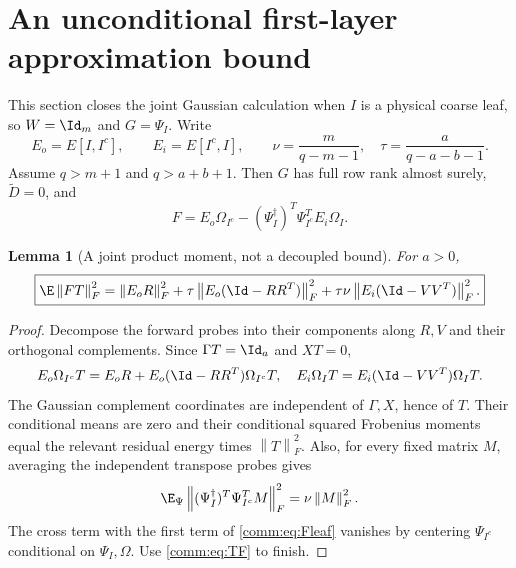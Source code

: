 \documentclass[11pt,oneside,openany,a4paper]{book}
\numberwithin{equation}{chapter}
\newtheorem{lemma}[theorem]{Lemma}
\theoremstyle{definition}
\theoremstyle{remark}
\newcommand{\F}[1]{\left\lVert#1\right\rVert_F}
\begin{document}
\section{An unconditional first-layer approximation bound}
This section closes the joint Gaussian calculation when $I$ is a physical coarse leaf, so $W=\Id_m$ and $G=\Psi_I$. Write
\[
 E_o=E[I,I^c],\qquad E_i=E[I^c,I],\qquad
 \nu=\frac{m}{q-m-1},\quad\tau=\frac{a}{q-a-b-1}.
\]
Assume $q>m+1$ and $q>a+b+1$. Then $G$ has full row rank almost surely, $\widetilde D=0$, and
\begin{equation}\label{comm:eq:Fleaf}
 F=E_o\Omega_{I^c}-(\Psi_I^\dagger)^T\Psi_{I^c}^T E_i\Omega_I.
\end{equation}

\begin{lemma}[A joint product moment, not a decoupled bound]\label{comm:lem:FTmoment}
For $a>0$,
\begin{equation}\label{comm:eq:FTmoment}
 \boxed{\E\F{FT}^2
 =\F{E_oR}^2+\tau\F{E_o(\Id-RR^T)}^2
 +\tau\nu\F{E_i(\Id-VV^T)}^2.}
\end{equation}
\end{lemma}
\begin{proof}
Decompose the forward probes into their components along $R,V$ and their orthogonal complements. Since $\Gamma T=\Id_a$ and $XT=0$,
\[
 E_o\Omega_{I^c}T=E_oR+E_o(\Id-RR^T)\Omega_{I^c}T,
 \quad
 E_i\Omega_IT=E_i(\Id-VV^T)\Omega_IT.
\]
The Gaussian complement coordinates are independent of $\Gamma,X$, hence of $T$. Their conditional means are zero and their conditional squared Frobenius moments equal the relevant residual energy times $\F T^2$. Also, for every fixed matrix $M$, averaging the independent transpose probes gives
\[
 \E_\Psi\F{(\Psi_I^\dagger)^T\Psi_{I^c}^TM}^2=\nu\F M^2.
\]
The cross term with the first term of \eqref{comm:eq:Fleaf} vanishes by centering $\Psi_{I^c}$ conditional on $\Psi_I,\Omega$. Use \eqref{comm:eq:TF} to finish.
\end{proof}
\end{document}
